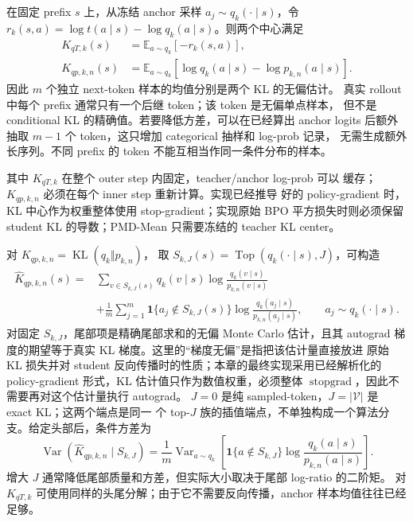 \documentclass[lang=cn,scheme=chinese,openany]{../book/elegantbook}
\newcommand{\sg}{\operatorname{stopgrad}}
\begin{document}
在固定 prefix $s$ 上，从冻结 anchor 采样 $a_j\sim q_k(\cdot\mid s)$，令 $r_k(s,a)=\log t(a\mid s)-\log q_k(a\mid s)$。则两个中心满足
\begin{align}
K_{qT,k}(s)&=\mathbb E_{a\sim q_k}[-r_k(s,a)],\\
K_{qp,k,n}(s)&=\mathbb E_{a\sim q_k}
\left[\log q_k(a\mid s)-\log p_{k,n}(a\mid s)\right].
\end{align}
因此 $m$ 个独立 next-token 样本的均值分别是两个 KL 的无偏估计。 真实 rollout 中每个 prefix 通常只有一个后继 token；该 token 是无偏单点样本， 但不是 conditional KL 的精确值。若要降低方差，可以在已经算出 anchor logits 后额外抽取 $m-1$ 个 token，这只增加 categorical 抽样和 log-prob 记录， 无需生成额外长序列。不同 prefix 的 token 不能互相当作同一条件分布的样本。

其中 $K_{qT,k}$ 在整个 outer step 内固定，teacher/anchor log-prob 可以 缓存；$K_{qp,k,n}$ 必须在每个 inner step 重新计算。实现已经推导 好的 policy-gradient 时，KL 中心作为权重整体使用 stop-gradient；实现原始 BPO 平方损失时则必须保留 student KL 的导数；PMD-Mean 只需要冻结的 teacher KL center。

对 $K_{qp,k,n}=\operatorname{KL}(q_k\Vert p_{k,n})$， 取 $S_{k,J}(s)=\operatorname{Top}(q_k(\cdot\mid s),J)$，可构造
\begin{align}
\widehat K_{qp,k,n}(s)
={}&\sum_{v\in S_{k,J}(s)}q_k(v\mid s)
\log\frac{q_k(v\mid s)}{p_{k,n}(v\mid s)}\\
&+\frac1m\sum_{j=1}^{m}\mathbf 1\{a_j\notin S_{k,J}(s)\}
\log\frac{q_k(a_j\mid s)}{p_{k,n}(a_j\mid s)},
\qquad a_j\sim q_k(\cdot\mid s).
\label{eq:ch2-opd-topk-anchor-kl}
\end{align}
对固定 $S_{k,J}$，尾部项是精确尾部求和的无偏 Monte Carlo 估计，且其 autograd 梯度的期望等于真实 KL 梯度。这里的“梯度无偏”是指把该估计量直接放进 原始 KL 损失并对 student 反向传播时的性质；本章的最终实现采用已经解析化的 policy-gradient 形式，KL 估计值只作为数值权重，必须整体 $\sg$，因此不需要再对这个估计量执行 autograd。 $J=0$ 是纯 sampled-token，$J=|\mathcal V|$ 是 exact KL；这两个端点是同一 个 top-$J$ 族的插值端点，不单独构成一个算法分支。给定头部后，条件方差为
\begin{equation}
\operatorname{Var}(\widehat K_{qp,k,n}\mid S_{k,J})
=\frac1m\operatorname{Var}_{a\sim q_k}\left[
\mathbf 1\{a\notin S_{k,J}\}
\log\frac{q_k(a\mid s)}{p_{k,n}(a\mid s)}\right].
\end{equation}
增大 $J$ 通常降低尾部质量和方差，但实际大小取决于尾部 log-ratio 的二阶矩。 对 $K_{qT,k}$ 可使用同样的头尾分解；由于它不需要反向传播，anchor 样本均值往往已经足够。
\end{document}
